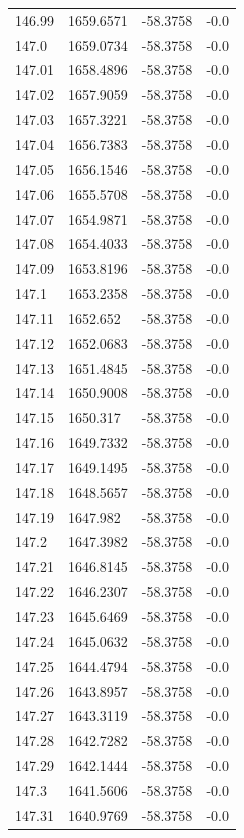 \begin{table}[H]
\begin{tabular}{llll}
146.99 & 1659.6571 & -58.3758 & -0.0 \\
147.0 & 1659.0734 & -58.3758 & -0.0 \\
147.01 & 1658.4896 & -58.3758 & -0.0 \\
147.02 & 1657.9059 & -58.3758 & -0.0 \\
147.03 & 1657.3221 & -58.3758 & -0.0 \\
147.04 & 1656.7383 & -58.3758 & -0.0 \\
147.05 & 1656.1546 & -58.3758 & -0.0 \\
147.06 & 1655.5708 & -58.3758 & -0.0 \\
147.07 & 1654.9871 & -58.3758 & -0.0 \\
147.08 & 1654.4033 & -58.3758 & -0.0 \\
147.09 & 1653.8196 & -58.3758 & -0.0 \\
147.1 & 1653.2358 & -58.3758 & -0.0 \\
147.11 & 1652.652 & -58.3758 & -0.0 \\
147.12 & 1652.0683 & -58.3758 & -0.0 \\
147.13 & 1651.4845 & -58.3758 & -0.0 \\
147.14 & 1650.9008 & -58.3758 & -0.0 \\
147.15 & 1650.317 & -58.3758 & -0.0 \\
147.16 & 1649.7332 & -58.3758 & -0.0 \\
147.17 & 1649.1495 & -58.3758 & -0.0 \\
147.18 & 1648.5657 & -58.3758 & -0.0 \\
147.19 & 1647.982 & -58.3758 & -0.0 \\
147.2 & 1647.3982 & -58.3758 & -0.0 \\
147.21 & 1646.8145 & -58.3758 & -0.0 \\
147.22 & 1646.2307 & -58.3758 & -0.0 \\
147.23 & 1645.6469 & -58.3758 & -0.0 \\
147.24 & 1645.0632 & -58.3758 & -0.0 \\
147.25 & 1644.4794 & -58.3758 & -0.0 \\
147.26 & 1643.8957 & -58.3758 & -0.0 \\
147.27 & 1643.3119 & -58.3758 & -0.0 \\
147.28 & 1642.7282 & -58.3758 & -0.0 \\
147.29 & 1642.1444 & -58.3758 & -0.0 \\
147.3 & 1641.5606 & -58.3758 & -0.0 \\
147.31 & 1640.9769 & -58.3758 & -0.0 \\

\end{tabular}
\end{table}
